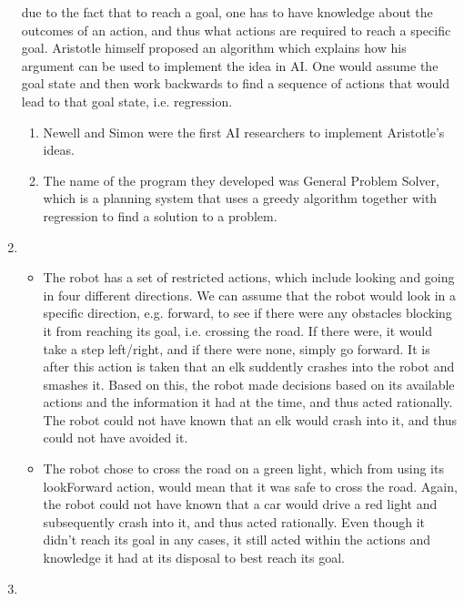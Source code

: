 \begin{enumerate}
    due to the fact that to reach a goal, one has to have knowledge about the 
    outcomes of an action, and thus what actions are required to reach a 
    specific goal. Aristotle himself proposed an algorithm which explains how
    his argument can be used to implement the idea in AI. One would assume the 
    goal state and then work backwards to find a sequence of actions that would
    lead to that goal state, i.e. regression.
    \begin{enumerate}
        \item 
            Newell and Simon were the first AI researchers to implement 
            Aristotle's ideas.
        \item 
            The name of the program they developed was General Problem Solver, 
            which is a planning system that uses a greedy algorithm together
            with regression to find a solution to a problem.
    \end{enumerate} 
    \autocite[p.~25]{russell2021artificial}
  \item 
    \begin{itemize}
    \item
        The robot has a set of restricted actions, which include looking and 
        going in four different directions. We can assume that the robot would 
        look in a specific direction, e.g. forward, to see if there were any 
        obstacles blocking it from reaching its goal, i.e. crossing the road. 
        If there were, it would take a step left/right, and if there were none, 
        simply go forward. It is after this action is taken that an elk 
        suddently crashes into the robot and smashes it. Based on this, the 
        robot made decisions based on its available actions and the information 
        it had at the time, and thus acted rationally. The robot could not have 
        known that an elk would crash into it, and thus could not have avoided 
        it. 
    \item
        The robot chose to cross the road on a green light, which from using its 
        lookForward action, would mean that it was safe to cross the road. 
        Again, the robot could not have known that a car would drive a red light 
        and subsequently crash into it, and thus acted rationally. Even though 
        it didn't reach its goal in any cases, it still acted within the actions 
        and knowledge it had at its disposal to best reach its goal.
    \end{itemize}
  \item 

\end{enumerate}
